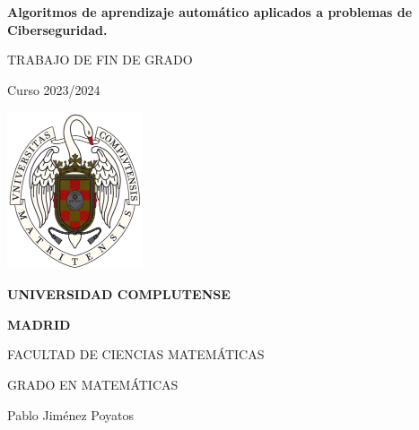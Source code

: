 \documentclass[11pt, a4paper]{article} %
\begin{document}
\begin{titlepage}
	
	
    \centering
	
	{\LARGE \textbf{Algoritmos de aprendizaje automático aplicados a problemas de Ciberseguridad.}\par}
    
	\vfill
	\vfill 
    
    {\LARGE \textsc{TRABAJO DE FIN DE GRADO}\par}
    
    \vspace*{0.2 cm}	 
    
    {\Large Curso 2023/2024\par}
    
    \vfill
    \vfill   
	
    \includegraphics[width=0.3\textwidth]{logo_UCM.png}\par
	
	\vfill  
    
    {\Large \textsc{\textbf{UNIVERSIDAD COMPLUTENSE}}\par}
    {\Large \textsc{\textbf{MADRID}}\par}
    
    
	\vfill   
	\vfill 
	\vfill  
	\vfill 
    
    {\Large FACULTAD DE CIENCIAS MATEMÁTICAS \par}
        
    {\Large GRADO EN MATEMÁTICAS \par}
    
    \vfill
	\vfill
	\vfill 
	\vfill 
    

    \begin{minipage}{0.8\textwidth}
        \begin{flushleft}
            {\Large Pablo Jiménez Poyatos}
        \end{flushleft}
    \end{minipage}
    

\end{titlepage}
\end{document}
